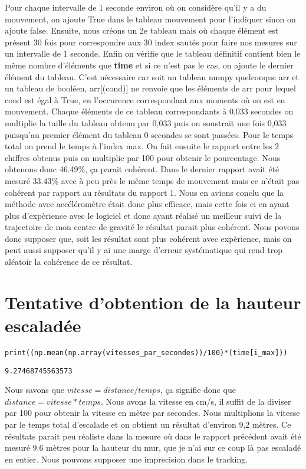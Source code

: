 \documentclass[11pt]{article}
\begin{document}
Pour chaque intervalle de 1 seconde environ où on considère qu'il y a du mouvement, on ajoute True dans le tableau mouvement pour l'indiquer sinon on
ajoute false. Ensuite, nous créons un 2e tableau mais où chaque élément est présent 30 fois pour correspondre aux 30 index sautés pour faire nos
mesures sur un intervalle de 1 seconde. Enfin on vérifie que le tableau définitif contient bien le même nombre d'éléments que \textbf{time} et si ce n'est
pas le cas, on ajoute le dernier élément du tableau. C'est nécessaire car soit un tableau numpy quelconque arr et un tableau de booléen, arr[(cond)]
ne renvoie que les éléments de arr pour lequel cond est égal à True, en l'occurence correspondant aux moments où on est en mouvement. Chaque éléments
de ce tableau correspondants à 0,033 secondes on multiplie la taille du tableau obtenu par 0,033 puis on soustrait une fois 0,033 puisqu'au premier
élément du tableau 0 secondes se sont passées. Pour le temps total on prend le temps à l'index max. On fait ensuite le rapport entre les 2 chiffres
obtenus puis on multiplie par 100 pour obtenir le pourcentage. Nous obtenons donc 46.49\%, ça parait cohérent. Dans le dernier rapport
avait été mesuré 33.43\% avec à peu près le même temps de mouvement mais ce n'était pas cohérent par rapport au résultats du rapport 1. Nous en avions
conclu que la méthode avec accéléromètre était donc plus efficace, mais cette fois ci en ayant plus d'expèrience avec le logiciel et donc ayant réalisé
un meilleur suivi de la trajectoire de mon centre de gravité le résultat parait plus cohérent. Nous povons donc supposer que, soit les résultat sont
plus cohérent avec expèrience, mais on peut aussi supposer qu'il y ai une marge d'erreur systématique qui rend trop aléatoir la cohérence de ce résultat.
\section{Tentative d'obtention de la hauteur escaladée}
\label{sec:orgddf04c4}

\begin{verbatim}
print((np.mean(np.array(vitesses_par_secondes))/100)*(time[i_max]))
\end{verbatim}

\label{org669cd64}
\begin{verbatim}
9.27468745563573
\end{verbatim}


Nous savons que \(vitesse = distance/temps\), ça signifie donc que \(distance = vitesse*temps\). Nous avons la vitesse en cm/s, il suffit de la diviser
par 100 pour obtenir la vitesse en mètre par secondes. Nous multiplions la vitesse par le temps total d'escalade et on obtient un résultat d'environ
9,2 mètres. Ce résultats parait peu réaliste dans la mesure où dans le rapport précédent avait été mesuré 9.6 mètres pour la hauteur du mur, que je
n'ai sur ce coup là pas escaladé en entier. Nous pouvons supposer une imprecision dans le tracking.
\end{document}
